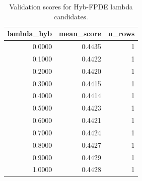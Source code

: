\begin{table}[t]
\caption{Validation scores for Hyb-FPDE lambda candidates.}
\label{tab:lambda_distribution_computed}
\centering
\begin{tabular}{rrr}
\toprule
lambda\_hyb & mean\_score & n\_rows \\
\midrule
0.0000 & 0.4435 & 1 \\
0.1000 & 0.4422 & 1 \\
0.2000 & 0.4420 & 1 \\
0.3000 & 0.4415 & 1 \\
0.4000 & 0.4414 & 1 \\
0.5000 & 0.4423 & 1 \\
0.6000 & 0.4421 & 1 \\
0.7000 & 0.4424 & 1 \\
0.8000 & 0.4427 & 1 \\
0.9000 & 0.4429 & 1 \\
1.0000 & 0.4428 & 1 \\
\bottomrule
\end{tabular}

\end{table}
